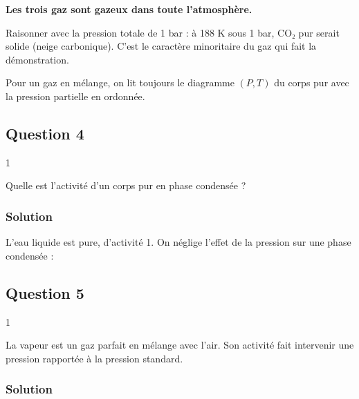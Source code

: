 \documentclass[11pt,a4paper]{article}
\newcommand{\equationajustee}[1]{%
  \sbox{\boiteequation}{$\displaystyle #1$}%
  \ifdim\wd\boiteequation>\linewidth
    \[\resizebox{\linewidth}{!}{\usebox{\boiteequation}}\]%
  \else
    \[#1\]%
  \fi}
\begin{document}
\textbf{Les trois gaz sont gazeux dans toute l'atmosphère.}

\begin{piege}

Raisonner avec la pression totale de 1 bar : à 188 K sous 1 bar, CO₂ pur serait solide (neige carbonique). C'est le caractère minoritaire du gaz qui fait la démonstration.

\end{piege}

\begin{methode}

Pour un gaz en mélange, on lit toujours le diagramme \((P,T)\) du corps pur avec la pression partielle en ordonnée.

\end{methode}

\hypertarget{question-4}{%
\subsection{Question 4}\label{question-4}}

\begin{indication}{1}

Quelle est l'activité d'un corps pur en phase condensée ?

\end{indication}

\hypertarget{solution-3}{%
\subsubsection{Solution}\label{solution-3}}

L'eau liquide est pure, d'activité 1. On néglige l'effet de la pression sur une phase condensée :
\equationajustee{\mu_\ell(T)=\mu_\ell^\circ(T)}

\hypertarget{question-5}{%
\subsection{Question 5}\label{question-5}}

\begin{indication}{1}

La vapeur est un gaz parfait en mélange avec l'air. Son activité fait intervenir une pression rapportée à la pression standard.

\end{indication}

\hypertarget{solution-4}{%
\subsubsection{Solution}\label{solution-4}}
\end{document}
